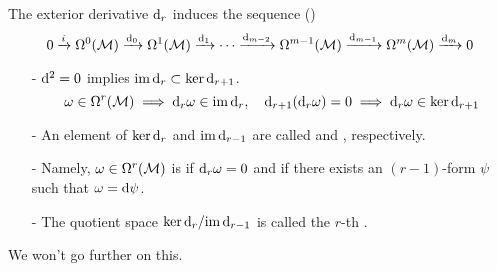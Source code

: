 \documentclass[a4paper, 10pt]{article}
\begin{document}
\begin{definition} The exterior derivative $\mathrm{d}_{r}$ induces the sequence ()
\[ 0 \xrightarrow{i} \Omega^{0}(\mathcal{M}) \xrightarrow{\mathrm{d}_{0}} \Omega^{1}(\mathcal{M}) \xrightarrow{\mathrm{d}_{1}} \cdots \xrightarrow{\mathrm{d}_{m-2}} \Omega^{m-1}(\mathcal{M}) \xrightarrow{\mathrm{d}_{m-1}} \Omega^{m}(\mathcal{M}) \xrightarrow{\mathrm{d}_{m}} 0 \]
\begin{itemize}
    \item[-] $\mathrm{d}^{2} = 0$ implies $\mathrm{im}\,\mathrm{d}_{r} \subset \ker\mathrm{d}_{r+1}$.
    \[ \omega \in \Omega^{r}(\mathcal{M}) \;\Longrightarrow\; \mathrm{d}_{r}\omega \in \mathrm{im}\,\mathrm{d}_{r}, \quad \mathrm{d}_{r+1}(\mathrm{d}_{r}\omega) = 0 \;\Longrightarrow\; \mathrm{d}_{r}\omega \in \ker\mathrm{d}_{r+1} \]
    \item[-] An element of $\ker\mathrm{d}_{r}$ and $\mathrm{im}\,\mathrm{d}_{r-1}$ are called  and , respectively.
    \item[-] Namely, $\omega \in \Omega^{r}(\mathcal{M})$ is  if $\mathrm{d}_{r}\omega = 0$ and  if there exists an $(r-1)$-form $\psi$ such that $\omega = \mathrm{d}\psi$.
    \item[-] The quotient space $\ker\mathrm{d}_{r}/\mathrm{im}\,\mathrm{d}_{r-1}$ is called the $r$-th .
\end{itemize}
    We won't go further on this.
\end{definition}
\end{document}
